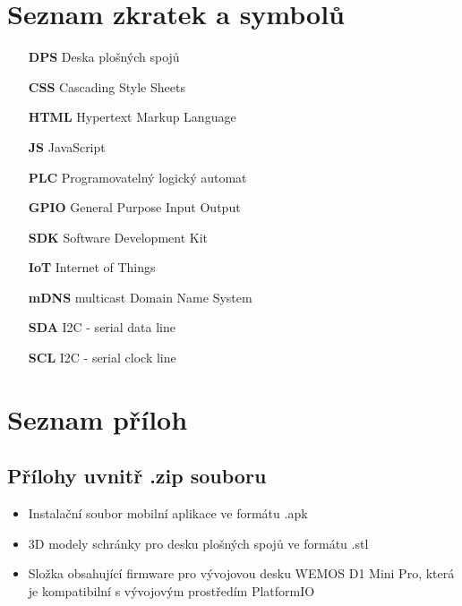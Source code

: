 \chapter*{Seznam zkratek a symbolů}
\label{chap:loa}
\begin{itemize}
    \item[\textbf{DPS}] Deska plošných spojů

    \item[\textbf{CSS}] Cascading Style Sheets

    \item[\textbf{HTML}] Hypertext Markup Language

    \item[\textbf{JS}] JavaScript

    \item[\textbf{PLC}] Programovatelný logický automat

    \item[\textbf{GPIO}] General Purpose Input Output

    \item[\textbf{SDK}] Software Development Kit

    \item[\textbf{IoT}] Internet of Things

    \item[\textbf{mDNS}] multicast Domain Name System

    \item[\textbf{SDA}] I2C - serial data line

    \item[\textbf{SCL}] I2C - serial clock line
\end{itemize}

\printbibliography[heading=bibintoc,title={Seznam zdrojů}]

\listoffigures

%
\chapter*{Seznam příloh}

\section*{Přílohy uvnitř .zip souboru}
\begin{itemize}
	\item Instalační soubor mobilní aplikace ve formátu .apk
	\item 3D modely schránky pro desku plošných spojů ve formátu .stl
	\item Složka obsahující firmware pro vývojovou desku WEMOS D1 Mini Pro, která je kompatibilní s vývojovým prostředím PlatformIO
\end{itemize}

